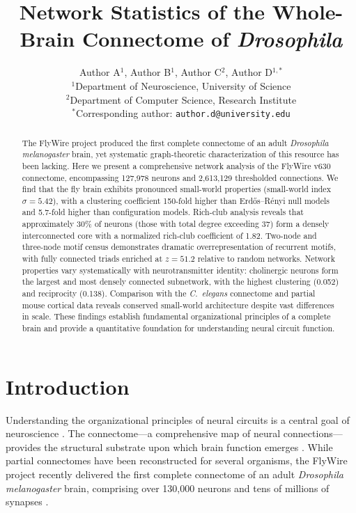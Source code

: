 \documentclass[11pt]{article}
\title{Network Statistics of the Whole-Brain Connectome of \textit{Drosophila}}
\author{%
  Author A$^{1}$, Author B$^{1}$, Author C$^{2}$, Author D$^{1,*}$\\[6pt]
  $^{1}$Department of Neuroscience, University of Science\\
  $^{2}$Department of Computer Science, Research Institute\\[4pt]
  $^{*}$Corresponding author: \texttt{author.d@university.edu}
}
\date{}
\begin{document}
\maketitle

\begin{abstract}
The FlyWire project produced the first complete connectome of an adult \textit{Drosophila melanogaster} brain, yet systematic graph-theoretic characterization of this resource has been lacking. Here we present a comprehensive network analysis of the FlyWire v630 connectome, encompassing 127,978 neurons and 2,613,129 thresholded connections. We find that the fly brain exhibits pronounced small-world properties (small-world index $\sigma = 5.42$), with a clustering coefficient 150-fold higher than Erd\H{o}s--R\'{e}nyi null models and 5.7-fold higher than configuration models. Rich-club analysis reveals that approximately 30\% of neurons (those with total degree exceeding 37) form a densely interconnected core with a normalized rich-club coefficient of 1.82. Two-node and three-node motif census demonstrates dramatic overrepresentation of recurrent motifs, with fully connected triads enriched at $z = 51.2$ relative to random networks. Network properties vary systematically with neurotransmitter identity: cholinergic neurons form the largest and most densely connected subnetwork, with the highest clustering (0.052) and reciprocity (0.138). Comparison with the \textit{C.~elegans} connectome and partial mouse cortical data reveals conserved small-world architecture despite vast differences in scale. These findings establish fundamental organizational principles of a complete brain and provide a quantitative foundation for understanding neural circuit function.
\end{abstract}

\section{Introduction}

Understanding the organizational principles of neural circuits is a central goal of neuroscience \citep{sporns2005human, bullmore2009complex}. The connectome---a comprehensive map of neural connections---provides the structural substrate upon which brain function emerges \citep{sporns2005human, seung2012connectome}. While partial connectomes have been reconstructed for several organisms, the FlyWire project recently delivered the first complete connectome of an adult \textit{Drosophila melanogaster} brain, comprising over 130,000 neurons and tens of millions of synapses \citep{dorkenwald2024neuronal, schlegel2024whole}.
\end{document}
